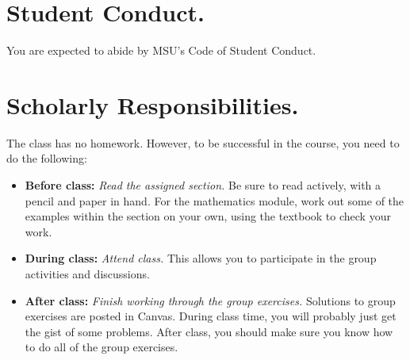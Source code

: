 \documentclass[letterpaper]{inzane_syllabus} %
\begin{document}
\vspace{0.3cm}
\section{Student Conduct.} You are expected to abide by MSU's Code of Student Conduct.
%
%


\vspace{0.3cm}
\section{Scholarly Responsibilities.} The class has no homework. However, to be successful in the course, you need to do the following:

\begin{itemize}
	\item \textbf{Before class:} \textit{Read the assigned section.} Be sure to read \alert{actively}, with a pencil and paper in hand.  For the mathematics module, work out some of the examples within the section on your own, using the textbook to check your work.  %
	\item \textbf{During class:} \textit{Attend class.} This allows you to participate in the group activities and discussions.
	\item \textbf{After class:} \textit{Finish working through the group exercises.}   Solutions to group exercises are posted in Canvas.  During class time, you will probably just get the gist of some problems. After class, you should make sure you know how to do \alert{all} of the group exercises.
\end{itemize}	
\end{document}
